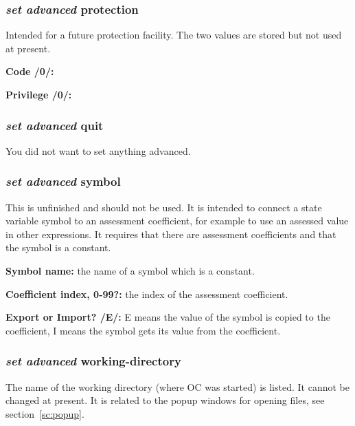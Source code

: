\documentclass[11pt]{article}
\begin{document}
\hypertarget{Set adv protect}{}
\subsubsection{{\em set advanced} protection}

Intended for a future protection facility.  The two values are stored
but not used at present.

{\bf Code /0/:}

{\bf Privilege /0/:}

\hypertarget{Set adv quit}{}
\subsubsection{{\em set advanced} quit}

You did not want to set anything advanced.

\hypertarget{Set adv symbol}{}
\subsubsection{{\em set advanced} symbol}

This is unfinished and should not be used.  It is intended to connect
a state variable symbol to an assessment coefficient, for example to
use an assessed value in other expressions.  It requires that there
are assessment coefficients and that the symbol is a constant.

{\bf Symbol name:} the name of a symbol which is a constant.

\hypertarget{Export symbol}{}
{\bf Coefficient index, 0-99?:} the index of the assessment
coefficient.

{\bf Export or Import? /E/:} E means the value of the symbol is copied
to the coefficient, I means the symbol gets its value from the
coefficient.

\hypertarget{Set adv workdir}{}
\subsubsection{{\em set advanced} working-directory}

The name of the working directory (where OC was started) is listed.
It cannot be changed at present.  It is related to the popup windows
for opening files, see section~\ref{sc:popup}.
\end{document}

